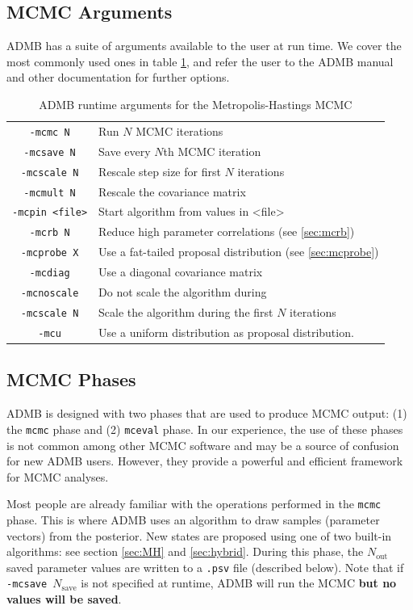 \documentclass{article}\usepackage[]{graphicx}\usepackage[]{color}
\begin{document}
\subsection{MCMC Arguments}
ADMB has a suite of arguments available to the user at run time. We cover
the most commonly used ones in table \ref{tab:mh_args}, and refer the
user to the ADMB manual and other documentation for further options.
\begin{table}[H]
  \centering
  \begin{tabular}[H]{|cl|}
    \hline
    \texttt{-mcmc N} & Run $N$ MCMC iterations\\
    \texttt{-mcsave N} & Save every $N$th MCMC iteration\\
    \texttt{-mcscale N} & Rescale step size for first $N$ iterations\\
    \texttt{-mcmult N} & Rescale the covariance matrix\\
    \texttt{-mcpin <file>} & Start algorithm from values in <file>\\
    \texttt{-mcrb N} & Reduce high parameter correlations
    (see \ref{sec:mcrb})\\
    \texttt{-mcprobe X} & Use a fat-tailed proposal
    distribution (see \ref{sec:mcprobe})\\
    \texttt{-mcdiag} & Use a diagonal covariance matrix\\
    \texttt{-mcnoscale} & Do not scale the algorithm during\\
    \texttt{-mcscale N} & Scale the algorithm during the
        first $N$ iterations\\
    \texttt{-mcu} & Use a uniform distribution as proposal distribution.\\
    \hline
  \end{tabular}
  \caption{ADMB runtime arguments for the Metropolis-Hastings MCMC}
  \label{tab:mh_args}
\end{table}

\subsection{MCMC Phases}
ADMB is designed with two phases that are used to produce
MCMC output: (1) the \texttt{mcmc} phase and (2)
\texttt{mceval} phase. In our experience, the use of these
phases is not common among other MCMC software and may be a
source of confusion for new ADMB users. However, they
provide a powerful and efficient framework for MCMC
analyses.

Most people are already familiar with the operations
performed in the \texttt{mcmc} phase. This is where ADMB
uses an algorithm to draw samples (parameter vectors) from
the posterior. New states are proposed using one of two
built-in algorithms: see section \ref{sec:MH} and
\ref{sec:hybrid}. During this phase, the $N_\text{out}$
saved parameter values are written to a \texttt{.psv} file
(described below). Note that if \texttt{-mcsave
  $N_\text{save}$} is not specified at runtime, ADMB will
run the MCMC \textbf{but no values will be saved}.
\end{document}
